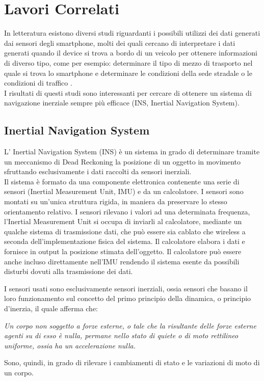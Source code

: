 \documentclass[12pt,a4paper,openright,twoside]{report}
\begin{document}
\clearpage{\pagestyle{empty}\cleardoublepage}
\chapter{Lavori Correlati}                %
\lhead[\fancyplain{}{\bfseries\thepage}]{\fancyplain{}{\bfseries\rightmark}}
In letteratura esistono diversi studi riguardanti i possibili utilizzi dei dati generati dai sensori degli smartphone, molti dei quali cercano di interpretare i dati generati quando il device si trova a bordo di un veicolo per ottenere informazioni di diverso tipo, come per esempio: determinare il tipo di mezzo di trasporto nel quale si trova lo smartphone \cite{K1, K2, K3, K4} e determinare le condizioni della sede stradale o le condizioni di traffico \cite{K5, K6}. \\

I risultati di questi studi sono interessanti per cercare di ottenere un sistema di navigazione inerziale sempre più efficace (INS, Inertial Navigation System).

\section{Inertial Navigation System}
L' Inertial Navigation System (INS) è un sistema in grado di determinare tramite un meccanismo di Dead Reckoning la posizione di un oggetto in movimento sfruttando esclusivamente i dati raccolti da sensori inerziali.\\

Il sistema è formato da una componente elettronica contenente una serie di sensori (Inertial Measurement Unit, IMU) e da un calcolatore. 
I sensori sono montati su un'unica struttura rigida, in maniera da preservare lo stesso orientamento relativo. I sensori rilevano i valori ad una determinata frequenza, l'Inertial Measurement Unit si occupa di inviarli al calcolatore, mediante un qualche sistema di trasmissione dati, che può essere sia cablato che wireless a seconda dell'implementazione fisica del sistema. Il calcolatore elabora i dati e fornisce in output la posizione stimata dell'oggetto. Il calcolatore può essere anche incluso direttamente nell'IMU rendendo il sistema esente da possibili disturbi dovuti alla trasmissione dei dati.

I sensori usati sono esclusivamente sensori inerziali, ossia sensori che basano il loro funzionamento sul concetto del primo principio della dinamica, o principio d'inerzia, il quale afferma che:
\begin{center}
\emph{Un corpo non soggetto a forze esterne, o tale che la risultante delle forze esterne agenti su di esso è nulla, permane nello stato di quiete o di moto rettilineo uniforme, ossia ha un accelerazione nulla.}
\end{center}
Sono, quindi, in grado di rilevare i cambiamenti di stato e le variazioni di moto di un corpo.
\end{document}
